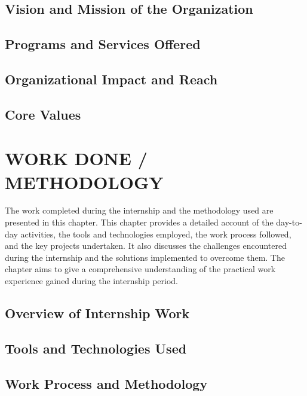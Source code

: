 \documentclass[12pt,a4paper]{report}
\begin{document}
\section{Vision and Mission of the Organization}


\section{Programs and Services Offered}


\section{Organizational Impact and Reach}


\section{Core Values}




\chapter{WORK DONE / METHODOLOGY}
\label{ch:work}


The work completed during the internship and the methodology used are presented in this chapter. This chapter provides a detailed account of the day-to-day activities, the tools and technologies employed, the work process followed, and the key projects undertaken. It also discusses the challenges encountered during the internship and the solutions implemented to overcome them. The chapter aims to give a comprehensive understanding of the practical work experience gained during the internship period.


\section{Overview of Internship Work}


\section{Tools and Technologies Used}




\section{Work Process and Methodology}
\end{document}
